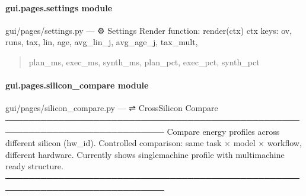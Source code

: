 \documentclass[letterpaper,10pt,english]{sphinxmanual}
\begin{document}
\sphinxstepscope


\paragraph{gui.pages.settings module}
\label{\detokenize{gui.pages.settings:module-gui.pages.settings}}\label{\detokenize{gui.pages.settings:gui-pages-settings-module}}\label{\detokenize{gui.pages.settings::doc}}
\sphinxAtStartPar
gui/pages/settings.py  —  ⚙  Settings
Render function: render(ctx)
ctx keys: ov, runs, tax, lin, age, avg\_lin\_j, avg\_age\_j, tax\_mult,
\begin{quote}

\sphinxAtStartPar
plan\_ms, exec\_ms, synth\_ms, plan\_pct, exec\_pct, synth\_pct
\end{quote}

\begin{fulllineitems}
\label{\detokenize{gui.pages.settings:gui.pages.settings.render}}
\pysigstartsignatures
\pysiglinewithargsret
{}
{}
{}
\pysigstopsignatures
\end{fulllineitems}


\sphinxstepscope


\paragraph{gui.pages.silicon\_compare module}
\label{\detokenize{gui.pages.silicon_compare:module-gui.pages.silicon_compare}}\label{\detokenize{gui.pages.silicon_compare:gui-pages-silicon-compare-module}}\label{\detokenize{gui.pages.silicon_compare::doc}}
\sphinxAtStartPar
gui/pages/silicon\_compare.py  —  ⇌  Cross\sphinxhyphen{}Silicon Compare
─────────────────────────────────────────────────────────────────────────────
Compare energy profiles across different silicon (hw\_id).
Controlled comparison: same task × model × workflow, different hardware.
Currently shows single\sphinxhyphen{}machine profile with multi\sphinxhyphen{}machine ready structure.
─────────────────────────────────────────────────────────────────────────────
\end{document}
